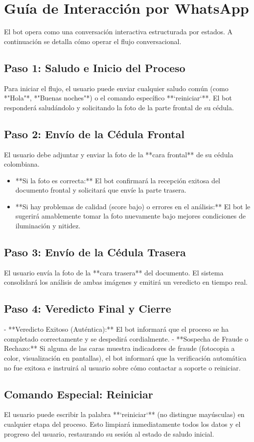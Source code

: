 \section{Guía de Interacción por WhatsApp}
\label{sec:interaction}

El bot opera como una conversación interactiva estructurada por estados. A continuación se detalla cómo operar el flujo conversacional.

\subsection{Paso 1: Saludo e Inicio del Proceso}
Para iniciar el flujo, el usuario puede enviar cualquier saludo común (como *"Hola"*, *"Buenas noches"*) o el comando específico **`reiniciar`**. El bot responderá saludándolo y solicitando la foto de la parte frontal de su cédula.

\subsection{Paso 2: Envío de la Cédula Frontal}
El usuario debe adjuntar y enviar la foto de la **cara frontal** de su cédula colombiana. 
\begin{itemize}
    \item **Si la foto es correcta:** El bot confirmará la recepción exitosa del documento frontal y solicitará que envíe la parte trasera.
    \item **Si hay problemas de calidad (score bajo) o errores en el análisis:** El bot le sugerirá amablemente tomar la foto nuevamente bajo mejores condiciones de iluminación y nitidez.
\end{itemize}

\subsection{Paso 3: Envío de la Cédula Trasera}
El usuario envía la foto de la **cara trasera** del documento. El sistema consolidará los análisis de ambas imágenes y emitirá un veredicto en tiempo real.

\subsection{Paso 4: Veredicto Final y Cierre}
- **Veredicto Exitoso (Auténtica):** El bot informará que el proceso se ha completado correctamente y se despedirá cordialmente.
- **Sospecha de Fraude o Rechazo:** Si alguna de las caras muestra indicadores de fraude (fotocopia a color, visualización en pantallas), el bot informará que la verificación automática no fue exitosa e instruirá al usuario sobre cómo contactar a soporte o reiniciar.

\subsection{Comando Especial: Reiniciar}
El usuario puede escribir la palabra **`reiniciar`** (no distingue mayúsculas) en cualquier etapa del proceso. Esto limpiará inmediatamente todos los datos y el progreso del usuario, restaurando su sesión al estado de saludo inicial.
